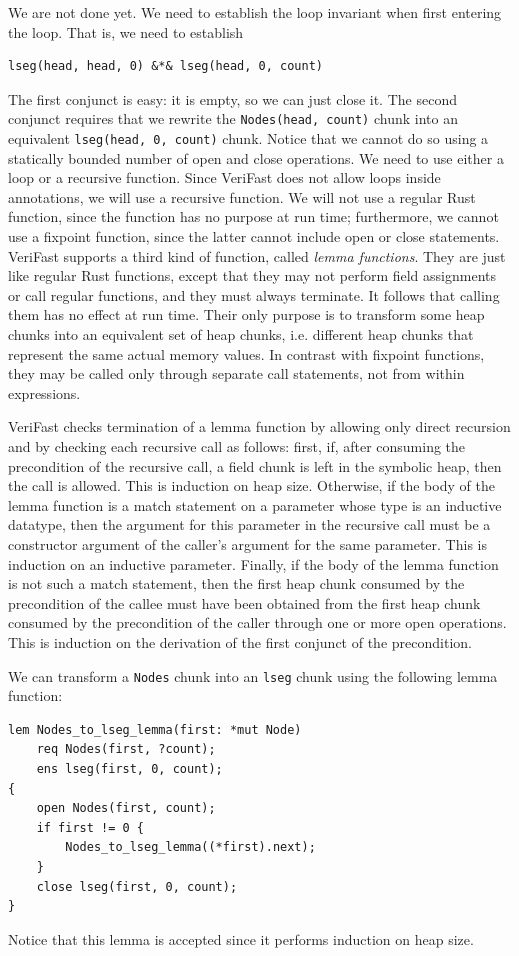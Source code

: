 \documentclass{article}
\begin{document}
We are not done yet. We need to establish the loop invariant
when first entering the loop. That is, we need to establish
\begin{lstlisting}
lseg(head, head, 0) &*& lseg(head, 0, count)
\end{lstlisting}
The first conjunct is easy: it is empty, so we can just close
it. The second conjunct requires that we rewrite the
\lstinline!Nodes(head, count)! chunk into an equivalent
\lstinline!lseg(head, 0, count)! chunk. Notice that we cannot
do so using a statically bounded number of open and close
operations. We need to use either a loop or a recursive
function. Since VeriFast does not allow loops inside
annotations, we will use a recursive function. We will not use
a regular Rust function, since the function has no purpose at run
time; furthermore, we cannot use a fixpoint function, since the
latter cannot include open or close statements. VeriFast
supports a third kind of function, called \emph{lemma
functions}. They are just like regular Rust functions, except that
they may not perform field assignments or call regular
functions, and they must always terminate. It follows that
calling them has no effect at run time. Their only purpose is
to transform some heap chunks into an equivalent set of heap
chunks, i.e. different heap chunks that represent the same
actual memory values. In contrast with fixpoint functions, they
may be called only through separate call statements, not from
within expressions.

VeriFast checks termination of a lemma function by allowing
only direct recursion and by checking each recursive call as
follows: first, if, after consuming the precondition of the
recursive call, a field chunk is left in the symbolic heap,
then the call is allowed. This is induction on heap size.
Otherwise, if the body of the lemma function is a match
statement on a parameter whose type is an inductive datatype,
then the argument for this parameter in the recursive call must
be a constructor argument of the caller's argument for the same
parameter. This is induction on an inductive parameter.
Finally, if the body of the lemma function is not such a match
statement, then the first heap chunk consumed by the
precondition of the callee must have been obtained from the
first heap chunk consumed by the precondition of the caller
through one or more open operations. This is induction on the
derivation of the first conjunct of the precondition.

We can transform a \lstinline!Nodes! chunk into an
\lstinline!lseg! chunk using the following lemma function:
\begin{lstlisting}
lem Nodes_to_lseg_lemma(first: *mut Node)
    req Nodes(first, ?count);
    ens lseg(first, 0, count);
{
    open Nodes(first, count);
    if first != 0 {
        Nodes_to_lseg_lemma((*first).next);
    }
    close lseg(first, 0, count);
}
\end{lstlisting}
Notice that this lemma is accepted since it performs induction
on heap size.
\end{document}
